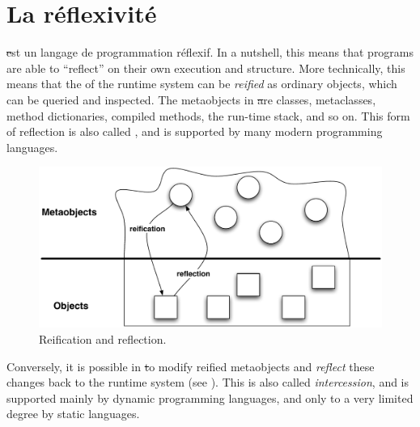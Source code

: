 \documentclass[a4paper,10pt,twoside]{book}
\begin{document}
	\sloppy
\fi

\chapter{La réflexivité}


\st est un langage de programmation réflexif. In a nutshell, this means that programs are able to ``reflect'' on their own execution and structure.
More technically, this means that the  of the runtime system can be \emph{reified} as ordinary objects, which can be queried and inspected.
The metaobjects in \st are classes, metaclasses, method dictionaries, compiled methods, the run-time stack, and so on.
This form of reflection is also called , and is supported by many modern programming languages.

\begin{figure}[ht]\centering
	\includegraphics[width=\linewidth]{reflect}
	\caption{Reification and reflection.} %
\end{figure}

Conversely, it is possible in \st to modify reified metaobjects and \emph{reflect} these changes back to the runtime system (see ).
This is also called \emph{intercession}, and is supported mainly by dynamic programming languages, and only to a very limited degree by static languages.
\end{document}
